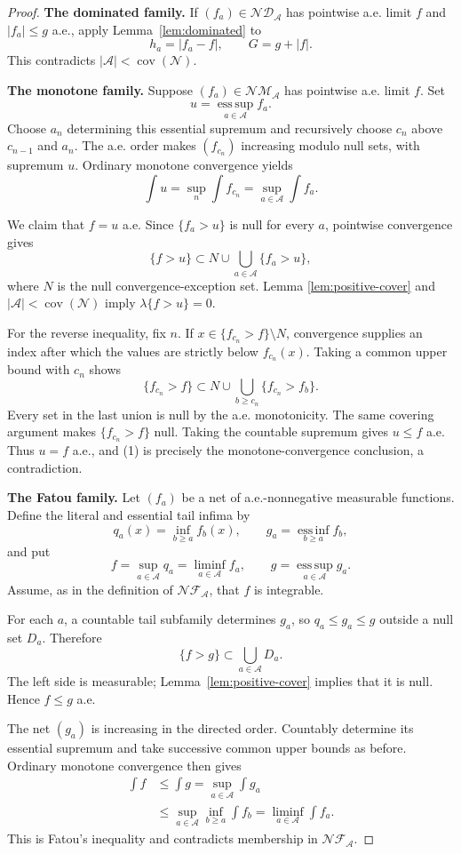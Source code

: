 \documentclass[11pt]{article}
\theoremstyle{remark}
\newcommand{\covN}{\operatorname{cov}(\mathcal N)}
\newcommand{\cNM}{\mathcal{NM}}
\newcommand{\cNF}{\mathcal{NF}}
\newcommand{\cND}{\mathcal{ND}}
\newcommand{\esssup}{\operatorname*{ess\,sup}}
\newcommand{\essinf}{\operatorname*{ess\,inf}}
\begin{document}
\begin{proof}
\textbf{The dominated family.}
If \((f_a)\in\cND_{\mathcal A}\) has pointwise a.e. limit \(f\) and
\(|f_a|\le g\) a.e., apply Lemma~\ref{lem:dominated} to
\[
       h_a=|f_a-f|,\qquad G=g+|f|.
\]
This contradicts \(|\mathcal A|<\covN\).

\medskip
\noindent
\textbf{The monotone family.}
Suppose \((f_a)\in\cNM_{\mathcal A}\) has pointwise a.e. limit \(f\).
Set
\[
                    u=\esssup_{a\in\mathcal A}f_a.
\]
Choose \(a_n\) determining this essential supremum and recursively choose
\(c_n\) above \(c_{n-1}\) and \(a_n\).  The a.e. order makes
\((f_{c_n})\) increasing modulo null sets, with supremum \(u\).  Ordinary
monotone convergence yields
\[
       \int u=\sup_n\int f_{c_n}
             =\sup_{a\in\mathcal A}\int f_a.
\tag{1}
\]

We claim that \(f=u\) a.e.  Since \(\{f_a>u\}\) is null for every \(a\),
pointwise convergence gives
\[
 \{f>u\}\subset N\cup\bigcup_{a\in\mathcal A}\{f_a>u\},
\tag{2}
\]
where \(N\) is the null convergence-exception set.  Lemma
\ref{lem:positive-cover} and \(|\mathcal A|<\covN\) imply
\(\lambda\{f>u\}=0\).

For the reverse inequality, fix \(n\).  If
\(x\in\{f_{c_n}>f\}\setminus N\), convergence supplies an index after which
the values are strictly below \(f_{c_n}(x)\).  Taking a common upper bound
with \(c_n\) shows
\[
 \{f_{c_n}>f\}\subset
 N\cup\bigcup_{b\ge c_n}\{f_{c_n}>f_b\}.
\tag{3}
\]
Every set in the last union is null by the a.e. monotonicity.  The same
covering argument makes \(\{f_{c_n}>f\}\) null.  Taking the countable
supremum gives \(u\le f\) a.e.  Thus \(u=f\) a.e., and (1) is precisely
the monotone-convergence conclusion, a contradiction.

\medskip
\noindent
\textbf{The Fatou family.}
Let \((f_a)\) be a net of a.e.-nonnegative measurable functions.  Define
the literal and essential tail infima by
\[
 q_a(x)=\inf_{b\ge a}f_b(x),\qquad
 g_a=\essinf_{b\ge a}f_b,
\]
and put
\[
 f=\sup_{a\in\mathcal A}q_a
      =\liminf_{a\in\mathcal A}f_a,\qquad
 g=\esssup_{a\in\mathcal A}g_a.
\]
Assume, as in the definition of \(\cNF_{\mathcal A}\), that \(f\) is
integrable.

For each \(a\), a countable tail subfamily determines \(g_a\), so
\(q_a\le g_a\le g\) outside a null set \(D_a\).  Therefore
\[
       \{f>g\}\subset\bigcup_{a\in\mathcal A}D_a.
\]
The left side is measurable; Lemma~\ref{lem:positive-cover} implies that it
is null.  Hence \(f\le g\) a.e.

The net \((g_a)\) is increasing in the directed order.  Countably determine
its essential supremum and take successive common upper bounds as before.
Ordinary monotone convergence then gives
\[
\begin{aligned}
 \int f
 &\le \int g
  = \sup_{a\in\mathcal A}\int g_a                                      \\
 &\le \sup_{a\in\mathcal A}\inf_{b\ge a}\int f_b
  = \liminf_{a\in\mathcal A}\int f_a.
\end{aligned}
\]
This is Fatou's inequality and contradicts membership in
\(\cNF_{\mathcal A}\).
\end{proof}
\end{document}
